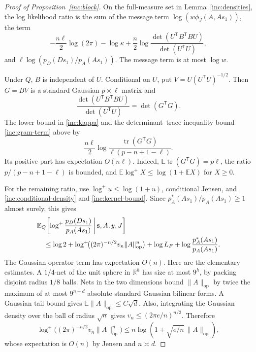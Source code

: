 \begin{proof}[Proof of Proposition~\ref{inc:block}]
On the full-measure set in Lemma~\ref{inc:densities}, the log likelihood
ratio is the sum of the message term \(\log(w\phi_J(A,As_1))\), the term
\begin{equation}\label{inc:gram-term}
 -\frac{n\ell}{2}\log(2\pi)-\log\kappa+
 \frac n2\log
 \frac{\det(U^{\mathsf T}B^{\mathsf T}BU)}{\det(U^{\mathsf T}U)},
\end{equation}
and \(\ell\log(p_D(Ds_1)/p_A(As_1))\).
The message term is at most \(\log w\).

Under \(Q\), \(B\) is independent of \(U\).  Conditional on \(U\), put
\(V=U(U^{\mathsf T}U)^{-1/2}\).  Then \(G=BV\) is a standard Gaussian
\(p\times\ell\) matrix and
\[
 \frac{\det(U^{\mathsf T}B^{\mathsf T}BU)}{\det(U^{\mathsf T}U)}
 =\det(G^{\mathsf T}G).
\]
The lower bound in \eqref{inc:kappa} and the determinant--trace
inequality bound \eqref{inc:gram-term} above by
\[
 \frac{n\ell}{2}\log
 \frac{\operatorname{tr}(G^{\mathsf T}G)}
      {\ell(p-n+1-\ell)}.
\]
Its positive part has expectation \(O(n\ell)\).  Indeed,
\(\mathbb E\operatorname{tr}(G^{\mathsf T}G)=p\ell\), the ratio
\(p/(p-n+1-\ell)\) is bounded, and
\(\mathbb E\log^+X\le\log(1+\mathbb E X)\) for \(X\ge0\).

For the remaining ratio, use
\(\log^+u\le\log(1+u)\), conditional Jensen, and
\eqref{inc:conditional-density} and \eqref{inc:kernel-bound}.  Since
\(p_A^*(As_1)/p_A(As_1)\ge1\) almost surely, this gives
\begin{align}
 &\mathbb E_Q\!\left[
   \log^+\frac{p_D(Ds_1)}{p_A(As_1)}
   \,\middle|\,\mathbf s,A,y,J\right]\notag\\
 &\quad\le \log2+
  \log^+\!\bigl((2\pi)^{-n/2}v_n\|A\|_{\mathrm{op}}^n\bigr)
  +\log L_F+\log\frac{p_A^*(As_1)}{p_A(As_1)}.
 \label{inc:log-ratio-conditional}
\end{align}
The Gaussian operator term has expectation \(O(n)\).  Here are the
elementary estimates.  A \(1/4\)-net of the unit sphere in
\(\mathbb R^h\) has size at most \(9^h\), by packing disjoint radius
\(1/8\) balls.  Nets in the two dimensions bound \(\|A\|_{\mathrm{op}}\)
by twice the maximum of at most \(9^{n+d}\) absolute standard Gaussian
bilinear forms.  A Gaussian tail bound gives
\(\mathbb E\|A\|_{\mathrm{op}}\le C\sqrt d\).
Also, integrating the Gaussian density over the ball of radius
\(\sqrt n\) gives \(v_n\le(2\pi e/n)^{n/2}\).  Therefore
\[
 \log^+\!\bigl((2\pi)^{-n/2}v_n\|A\|_{\mathrm{op}}^n\bigr)
 \le n\log(1+\sqrt{e/n}\,\|A\|_{\mathrm{op}}),
\]
whose expectation is \(O(n)\) by Jensen and \(n\asymp d\).


\end{proof}
